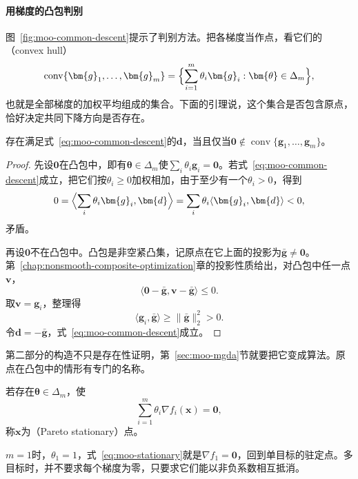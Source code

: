 \paragraph{用梯度的凸包判别}
图~\ref{fig:moo-common-descent}提示了判别方法。把各梯度当作点，看它们的（convex hull）
\[
 \operatorname{conv}\{\bm{g}_1,\ldots,\bm{g}_m\}=\Bigl\{\sum_{i=1}^m\theta_i\bm{g}_i:\bm{\theta}\in\Delta_m\Bigr\},
\]
也就是全部梯度的加权平均组成的集合。下面的引理说，这个集合是否包含原点，恰好决定共同下降方向是否存在。

\begin{lemma}[共同下降方向的存在性]
\label{lem:moo-gordan}
存在满足式~\eqref{eq:moo-common-descent}的$\bm{d}$，当且仅当$\bm{0}\notin\operatorname{conv}\{\bm{g}_1,\ldots,\bm{g}_m\}$。
\end{lemma}

\begin{proof}
先设$\bm{0}$在凸包中，即有$\bm{\theta}\in\Delta_m$使$\sum_i\theta_i\bm{g}_i=\bm{0}$。若式~\eqref{eq:moo-common-descent}成立，把它们按$\theta_i\geq0$加权相加，由于至少有一个$\theta_i>0$，得到
\[
 0=\Bigl\langle\sum_i\theta_i\bm{g}_i,\bm{d}\Bigr\rangle=\sum_i\theta_i\langle\bm{g}_i,\bm{d}\rangle<0,
\]
矛盾。

再设$\bm{0}$不在凸包中。凸包是非空紧凸集，记原点在它上面的投影为$\bar{\bm{g}}\neq\bm{0}$。第~\ref{chap:nonsmooth-composite-optimization}章的投影性质给出，对凸包中任一点$\bm{v}$，
\[
 \langle\bm{0}-\bar{\bm{g}},\bm{v}-\bar{\bm{g}}\rangle\leq0.
\]
取$\bm{v}=\bm{g}_i$，整理得
\[
 \langle\bm{g}_i,\bar{\bm{g}}\rangle\geq\lVert\bar{\bm{g}}\rVert_2^2>0.
\]
令$\bm{d}=-\bar{\bm{g}}$，式~\eqref{eq:moo-common-descent}成立。
\end{proof}

第二部分的构造不只是存在性证明，第~\ref{sec:moo-mgda}节就要把它变成算法。原点在凸包中的情形有专门的名称。

\begin{definition}[Pareto驻定]
\label{def:moo-stationary}
若存在$\bm{\theta}\in\Delta_m$，使
\begin{equation}
 \sum_{i=1}^m\theta_i\nabla f_i(\bm{x})=\bm{0},
 \label{eq:moo-stationary}
\end{equation}
称$\bm{x}$为（Pareto stationary）点。
\end{definition}

$m=1$时，$\theta_1=1$，式~\eqref{eq:moo-stationary}就是$\nabla f_1=\bm{0}$，回到单目标的驻定点。多目标时，并不要求每个梯度为零，只要求它们能以非负系数相互抵消。

